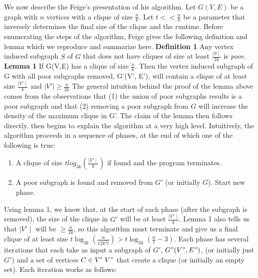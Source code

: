 \documentclass{article}
\theoremstyle{definition}
\begin{document}
We now describe the Feige's presentation of his algorithm.  Let $G(V,E)$ be a graph with $n$ vertices with a clique of size $\frac{n}{k}$. Let $t << \frac{n}{k}$ be a parameter that inversely determines the final size of the clique and the runtime.  Before enumerating the steps of the algorithm, Feige 
gives the following definition and lemma which we reproduce and summarize here.
\newline\newline
\noindent \textbf{Definition 1 } Any vertex induced subgraph $S$ of $G$ that does not have cliques of size at least $\frac{\mid S\mid }{2k}$ is \textit{poor}.
\newline\newline
\noindent \textbf{Lemma 1 } If G(V,E) has a clique of size $\frac{n}{k}$. Then the vertex induced subgraph of G with all poor subgraphs removed, G'(V', E'), will contain a clique of at least size $\frac{\mid V'\mid }{k}$ and $\mid V'\mid  \geq \frac{n}{2k}$
\newline\newline
The general intuition behind the proof of the lemma above comes from the observations that (1) the union of poor subgraphs results is a poor subgraph and
that (2) removing a poor subgraph from $G$ will increase the density of the maximum clique in G'.  The claim of the lemma then follows directly.
\newline\newline
\cite{FeigeApprox} then begins to explain the algorithm at a very high level.  Intuitively, the algorithm proceeds in a sequence of phases, 
at the end of which one of the following is true:
\begin{enumerate}
\item{A clique of size $tlog_{3k}(\frac{\mid V'\mid }{k})$ if found and the program terminates.}
\item{A poor subgraph is found and removed from $G'$ (or initially $G$). Start new phase.}
\end{enumerate}
Using lemma 1, we know that, at the start of each phase (after the subgraph is removed), the size of the clique in $G'$ will be at least $\frac{\mid V'\mid }{k}$. Lemma 1 also tells us that $\mid V'\mid $ will be $\geq \frac{n}{2k}$, so this algorithm must terminate and give us a final clique of at least size $t \log_{3k}(\frac{n}{12k^2t}) > t\log_{3k}(\frac{n}{t} - 3)$.
Each phase has several iterations that each take as input a subgraph of $G'$, $G"(V", E")$, (or initially just $G'$) and a set of vertices $C \in V' \ V"$ that create a clique (or initially an empty set). Each iteration works as follows:
\end{document}

